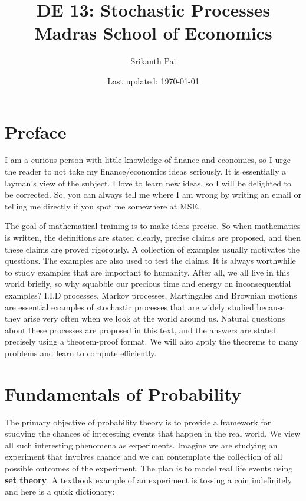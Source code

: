 \documentclass[letterpaper, 12pt]{article}
\newcommand{\1}{\mathds{1}} %
\theoremstyle{definition}
\begin{document}

\title{DE 13: Stochastic Processes \\[1em]
\normalsize Madras School of Economics}


\author{\normalsize Srikanth Pai}
\date{\normalsize\vspace{-1ex} Last updated: \today}


\maketitle
\tableofcontents\label{sec:contents}

\newpage
\section*{Preface}

I am a curious person with little knowledge of finance and economics, so I urge the reader to not take my finance/economics ideas seriously. It is essentially a layman’s view of the subject. I love to learn new ideas, so I will be delighted to be corrected. So, you can always tell me where I am wrong by writing an email or telling me directly if you spot me somewhere at MSE.

The goal of mathematical training is to make ideas precise. So when mathematics is written, the definitions are stated clearly, precise claims are proposed, and then these claims are proved rigorously. A collection of examples usually motivates the questions. The examples are also used to test the claims. It is always worthwhile to study examples that are important to humanity. After all, we all live in this world briefly, so why squabble our precious time and energy on inconsequential examples? I.I.D processes, Markov processes, Martingales and Brownian motions are essential examples of stochastic processes that are widely studied because they arise very often when we look at the world around us. Natural questions about these processes are proposed in this text, and the answers are stated precisely using a theorem-proof format. We will also apply the theorems to many problems and learn to compute efficiently.
\newpage

\section{Fundamentals of Probability}
The primary objective of probability theory is to provide a framework for studying the chances of interesting events that happen in the real world. We view all such interesting phenomena as experiments. Imagine we are studying an experiment that involves chance and we can contemplate the collection of all possible outcomes of the experiment. The plan is to model real life events using {\bf set theory}. A textbook example of an experiment is tossing a coin indefinitely and here is a quick dictionary:
\end{document}

